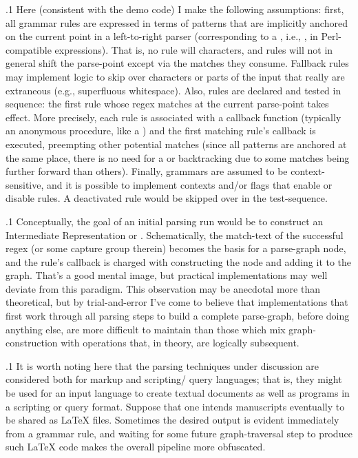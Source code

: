 \documentclass[11pt, twocolumn]{article}
\begin{document}
\p.1{%
Here (consistent with the demo code) I make the following assumptions: first, all
grammar rules are expressed in terms of patterns that are implicitly
anchored on the current point in a left-to-right parser (corresponding
to a , i.e., \slashA{}, in Perl-compatible expressions). That is, no rule
will  characters, and rules will not in general shift the 
parse-point except via the matches they consume. Fallback rules may
implement logic to skip over characters or parts of the input that
really are extraneous (e.g., superfluous whitespace). Also,
rules are declared and tested in sequence: the first rule whose
regex matches at the current parse-point takes effect. More
precisely, each rule is associated with a callback function (typically
an anonymous procedure, like a  ) and the first matching
rule's callback is executed, preempting other potential
matches (since all patterns are anchored at the same place, there
is no need for a  or backtracking due to some matches being further
forward than others). Finally, grammars are assumed to be context-sensitive,
and it is possible to implement contexts and/or flags that
enable or disable rules. A deactivated rule would be skipped over
in the test-sequence.
}%

\p.1{%
\enlargethispage{1em}Conceptually, the goal of an initial parsing run would be to construct
an Intermediate Representation or . Schematically, the
match-text of the successful regex (or some capture group therein) becomes
the basis for a parse-graph node, and the rule's callback
is charged with constructing the node and adding it to the graph.
That's a good mental image, but practical implementations
may well deviate from this paradigm. This observation may be
anecdotal more than theoretical, but by trial-and-error
I've come to believe that implementations that first
work through all parsing steps to build a complete parse-graph, before
doing anything else, are more difficult to maintain
than those which mix graph-construction with operations that, in
theory, are logically subsequent.
}%

\p.1{%
It is worth noting here that the parsing techniques under discussion
are considered both for markup and scripting/ query languages; that is,
they might be used for an input language to create textual
documents as well as programs in a scripting or query format. Suppose
that one intends manuscripts eventually to be shared as
\LaTeX{} files. Sometimes the desired output is evident immediately
from a grammar rule, and waiting for some future graph-traversal
step to produce such \LaTeX{} code makes the overall pipeline more obfuscated.
}%
\end{document}
